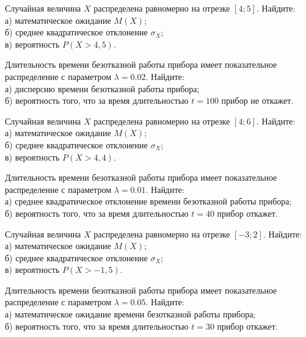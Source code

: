 \vfill

\newpage\setcounter{zad}{0}

\z Случайная величина $X$ распределена равномерно на отрезке $[4; 5]$. Найдите: \\ \quad а) математическое ожидание $M(X)$; \\ \quad б) среднее квадратическое отклонение $\sigma_X$; \\ \quad в) вероятность $P(X>4{,}5)$.


\vfill

\z Длительность времени безотказной работы прибора имеет показательное распределение с параметром $\lambda = 0.02$. Найдите: \\ \quad а) дисперсию времени безотказной работы прибора; \\ \quad б) вероятность того, что за время длительностью $t = 100$ прибор не откажет.
 

\vfill

\newpage\setcounter{zad}{0}

\z Случайная величина $X$ распределена равномерно на отрезке $[4; 6]$. Найдите: \\ \quad а) математическое ожидание $M(X)$; \\ \quad б) среднее квадратическое отклонение $\sigma_X$; \\ \quad в) вероятность $P(X>4{,}4)$.


\vfill

\z Длительность времени безотказной работы прибора имеет показательное распределение с параметром $\lambda = 0.01$. Найдите: \\ \quad а) среднее квадратическое отклонение времени безотказной работы прибора; \\ \quad б) вероятность того, что за время длительностью $t = 40$ прибор откажет.
 

\vfill

\newpage\setcounter{zad}{0}

\z Случайная величина $X$ распределена равномерно на отрезке $[-3; 2]$. Найдите: \\ \quad а) математическое ожидание $M(X)$; \\ \quad б) среднее квадратическое отклонение $\sigma_X$; \\ \quad в) вероятность $P(X>-1{,}5)$.


\vfill

\z Длительность времени безотказной работы прибора имеет показательное распределение с параметром $\lambda = 0.05$. Найдите: \\ \quad а) математическое ожидание времени безотказной работы прибора; \\ \quad б) вероятность того, что за время длительностью $t = 30$ прибор откажет.
 

